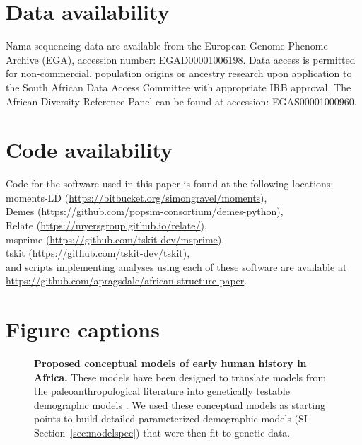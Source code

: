 \documentclass[]{article}
\begin{document}
{\section*{Data availability}

Nama sequencing data are available from the European Genome-Phenome Archive
(EGA), accession number: EGAD00001006198. Data access is permitted for non-commercial, 
population origins or ancestry research
upon application to the South African Data Access Committee with appropriate IRB approval. 
The African Diversity Reference Panel can be found at accession: EGAS00001000960.

\section*{Code availability}

Code for the software used in this paper is found at the following locations:\\
moments-LD (\url{https://bitbucket.org/simongravel/moments}),\\
Demes (\url{https://github.com/popsim-consortium/demes-python}),\\
Relate (\url{https://myersgroup.github.io/relate/}),\\
msprime (\url{https://github.com/tskit-dev/msprime}),\\
tskit (\url{https://github.com/tskit-dev/tskit}),\\
and scripts implementing analyses using each of these software are available at\\
\url{https://github.com/apragsdale/african-structure-paper}.

\break

\section*{Figure captions}

\begin{figure}[ht]
    \centering
    \caption{
        \textbf{Proposed conceptual models of early human history in Africa.}
        These models have been designed to translate models from the 
        paleoanthropological literature into genetically testable demographic
        models \citep{Henn2018-rf}.
        We used these conceptual models as starting points to build detailed
        parameterized demographic models (SI Section~\ref{sec:modelspec})
        that were then fit to genetic data. 
    }
    \label{fig:proposed-models}
\end{figure}

}
\end{document}
